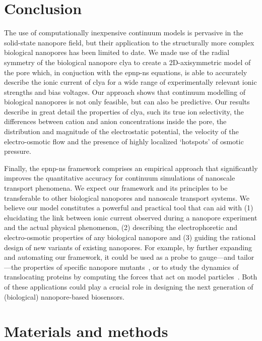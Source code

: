 \section{Conclusion}
%
\label{sec:transport:conclusion}
%

The use of computationally inexpensive continuum models is pervasive in the solid-state nanopore field, but
their application to the structurally more complex biological nanopores has been limited to date. We made use
of the radial symmetry of the biological nanopore \gls{clya} to create a 2D-axisymmetric model of the pore
which, in conjuction with the \gls{epnp-ns} equations, is able to accurately describe the ionic current of
\gls{clya} for a wide range of experimentally relevant ionic strengths and bias voltages. Our approach shows
that continuum modelling of biological nanopores is not only feasible, but can also be predictive. Our results
describe in great detail the properties of \gls{clya}, such its true ion selectivity, the differences between
cation and anion concentrations inside the pore, the distribution and magnitude of the electrostatic
potential, the velocity of the electro-osmotic flow and the presence of highly localized `hotspots' of osmotic
pressure. 

Finally, the \gls{epnp-ns} framework comprises an empirical approach that significantly improves the
quantitative accuracy for continuum simulations of nanoscale transport phenomena. We expect our framework and
its principles to be transferable to other biological nanopores and nanoscale transport systems. We believe
our model constitutes a powerful and practical tool that can aid with (1) elucidating the link between ionic
current observed during a nanopore experiment and the actual physical phenomenon, (2) describing the
electrophoretic and electro-osmotic properties of any biological nanopore and (3) guiding the rational design
of new variants of existing nanopores. For example, by further expanding and automating our framework, it
could be used as a probe to gauge---and tailor---the properties of specific nanopore
mutants~\cite{Huang-2020,Cao-2019}, or to study the dynamics of translocating proteins by computing the forces
that act on model particles~\cite{Willems-Ruic-Biesemans-2019}. Both of these applications could play a
crucial role in designing the next generation of (biological) nanopore-based biosensors.


\section{Materials and methods}
%
\label{sec:transport:methods}
%
%

